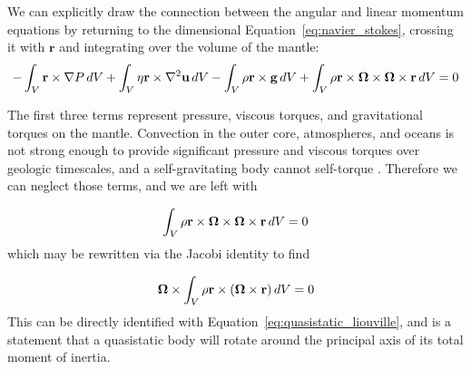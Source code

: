 \documentclass[extra,mreferee]{gji}
\newif\ifdetail
\begin{document}
We can explicitly draw the connection between the angular and linear momentum equations by returning to the dimensional
Equation~\eqref{eq:navier_stokes}, crossing it with $\mathbf{r}$ and integrating over the volume of the mantle:
\begin{equation}
\begin{aligned}
-\int_V \mathbf{r} \times \nabla P \,dV + \int_V \eta \mathbf{r} \times \nabla^2 \mathbf{u} \,dV - \int_V \rho \mathbf{r} \times \mathbf{g} \,dV 
   + \int_V \rho \mathbf{r} \times \mitbf{\Omega} \times \mitbf{\Omega} \times \mathbf{r}  \,dV &= 0 \\
\end{aligned}
\end{equation}


The first three terms represent pressure, viscous torques, and gravitational torques on the mantle.  
Convection in the outer core, atmospheres, and oceans is not strong enough to provide significant pressure and viscous torques over geologic timescales, and a self-gravitating body cannot self-torque \citep{braginsky1995equations}.
Therefore we can neglect those terms, and we are left with

\begin{equation}
\begin{aligned}
\int_V \rho \mathbf{r} \times \mitbf{\Omega} \times \mitbf{\Omega} \times \mathbf{r} \,dV &= 0 \\
\label{eq:quasistatic_angular_momentum}
\end{aligned}
\end{equation}
which may be rewritten via the Jacobi identity to find
\ifdetail
\begin{equation}
\begin{aligned}
- \int_V \rho (\mitbf{\Omega}\times \mathbf{r}) \times ( \mathbf{r} \times \mitbf{\Omega} ) \,dV + 
- \int_V \rho \mitbf{\Omega}\times(\mitbf{\Omega}\times \mathbf{r}) \times \mathbf{r} \,dV &= 0 \\
\end{aligned}
\end{equation}
\fi
\begin{equation}
\begin{aligned}
 \mitbf{\Omega} \times \int_V \rho \mathbf{r} \times (\mitbf{\Omega}\times \mathbf{r}) \,dV &= 0 \\
\end{aligned}
\end{equation}
This can be directly identified with Equation~\eqref{eq:quasistatic_liouville},
and is a statement that a quasistatic body will rotate around the principal axis of its total moment of inertia.
\end{document}
